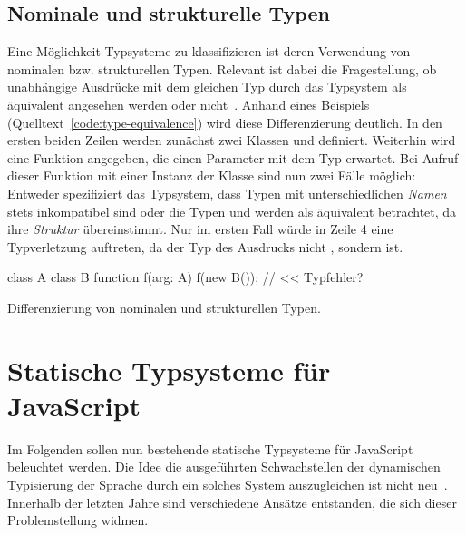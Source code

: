 \subsection{Nominale und strukturelle Typen}
Eine Möglichkeit Typsysteme zu klassifizieren ist deren Verwendung von nominalen bzw. strukturellen Typen. Relevant ist dabei die Fragestellung, ob unabhängige Ausdrücke mit dem gleichen Typ durch das Typsystem als äquivalent angesehen werden oder nicht~\autocite[9]{CARDELLI:TYPE_SYSTEMS}. Anhand eines Beispiels (Quelltext~\ref{code:type-equivalence}) wird diese Differenzierung deutlich. In den ersten beiden Zeilen werden zunächst zwei Klassen  und  definiert. Weiterhin wird eine Funktion  angegeben, die einen Parameter mit dem Typ  erwartet. Bei Aufruf dieser Funktion mit einer Instanz der Klasse  sind nun zwei Fälle möglich: Entweder spezifiziert das Typsystem, dass Typen mit unterschiedlichen \emph{Namen} stets inkompatibel sind oder die Typen  und  werden als äquivalent betrachtet, da ihre \emph{Struktur} übereinstimmt. Nur im ersten Fall würde in Zeile 4 eine Typverletzung auftreten, da der Typ des Ausdrucks  nicht , sondern  ist.

\bigbreak
\begin{listing}[htb]
\begin{textcode}
class A {}
class B {}
function f(arg: A) {}
f(new B()); // << Typfehler?
\end{textcode}
\listingvspace
\caption{Differenzierung von nominalen und strukturellen Typen.}
\label{code:type-equivalence}
\end{listing}




\section{Statische Typsysteme für JavaScript}
\label{sec:static-typesystems-for-js}

Im Folgenden sollen nun bestehende statische Typsysteme für JavaScript beleuchtet werden. Die Idee die ausgeführten Schwachstellen der dynamischen Typisierung der Sprache durch ein solches System auszugleichen ist nicht neu~\autocite[2]{FLOW:PAPER}. Innerhalb der letzten Jahre sind verschiedene Ansätze entstanden, die sich dieser Problemstellung widmen.




